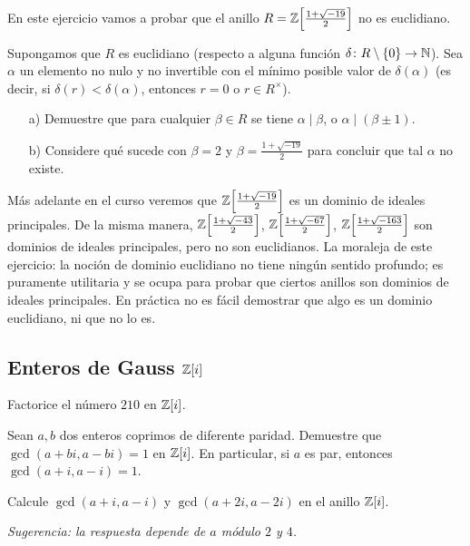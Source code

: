 \begin{ejercicio}
  En este ejercicio vamos a probar que el anillo
  $R = \mathbb{Z} \Bigl[\frac{1+\sqrt{-19}}{2}\Bigr]$ no es euclidiano.

  Supongamos que $R$ es euclidiano (respecto a alguna función
  $\delta\colon R\setminus \{0\} \to \mathbb{N}$). Sea $\alpha$ un elemento no nulo
  y no invertible con el mínimo posible valor de $\delta (\alpha)$
  (es decir, si $\delta (r) < \delta (\alpha)$, entonces $r = 0$ o
  $r \in R^\times$).

  \begin{enumerate}
  \item[a)] Demuestre que para cualquier $\beta \in R$ se tiene
    $\alpha \mid \beta$, o $\alpha \mid (\beta \pm 1)$.

  \item[b)] Considere qué sucede con $\beta = 2$ y
    $\beta = \frac{1+\sqrt{-19}}{2}$ para concluir que tal $\alpha$ no existe.
  \end{enumerate}

  Más adelante en el curso veremos que $\mathbb{Z} \Bigl[\frac{1+\sqrt{-19}}{2}\Bigr]$
  es un dominio de ideales principales. De la misma manera,
  $\mathbb{Z} \Bigl[\frac{1+\sqrt{-43}}{2}\Bigr]$,
  $\mathbb{Z} \Bigl[\frac{1+\sqrt{-67}}{2}\Bigr]$,
  $\mathbb{Z} \Bigl[\frac{1+\sqrt{-163}}{2}\Bigr]$
  son dominios de ideales principales, pero no son euclidianos. La moraleja de
  este ejercicio: la noción de dominio euclidiano no tiene ningún sentido
  profundo; es puramente utilitaria y se ocupa para probar que ciertos anillos
  son dominios de ideales principales. En práctica no es fácil demostrar que
  algo es un dominio euclidiano, ni que no lo es.
\end{ejercicio}

\subsection*{Enteros de Gauss $\mathbb{Z} [i]$}

\begin{ejercicio}
  Factorice el número $210$ en $\mathbb{Z} [i]$.
\end{ejercicio}

\begin{ejercicio}
  Sean $a,b$ dos enteros coprimos de diferente paridad. Demuestre que
  $\gcd (a + bi, a - bi) = 1$ en $\mathbb{Z} [i]$. En particular, si $a$ es par,
  entonces $\gcd (a + i, a - i) = 1$.
\end{ejercicio}

\begin{ejercicio}
  Calcule $\gcd (a + i, a - i)$ y $\gcd (a + 2i, a - 2i)$ en el anillo
  $\mathbb{Z} [i]$.

  \emph{Sugerencia: la respuesta depende de $a$ módulo $2$ y $4$.}
\end{ejercicio}

